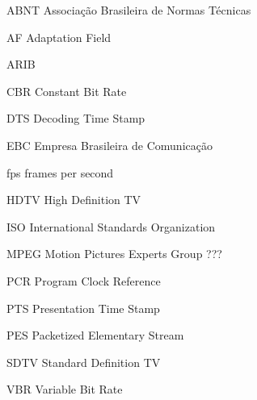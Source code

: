 \begin{siglas}
  \item[ABNT] Associação Brasileira de Normas Técnicas
  \item[AF] Adaptation Field
  \item[ARIB] 
  \item[CBR] Constant Bit Rate
  \item[DTS] Decoding Time Stamp
  \item[EBC] Empresa Brasileira de Comunicação
  \item[fps] frames per second
  \item[HDTV] High Definition TV
  \item[ISO] International Standards Organization
  \item[MPEG] Motion Pictures Experts Group ???
  \item[PCR] Program Clock Reference
  \item[PTS] Presentation Time Stamp
  \item[PES] Packetized Elementary Stream
  \item[SDTV] Standard Definition TV
  \item[VBR] Variable Bit Rate
  \item[]
  \item[]
  \item[]
  
  
\end{siglas}